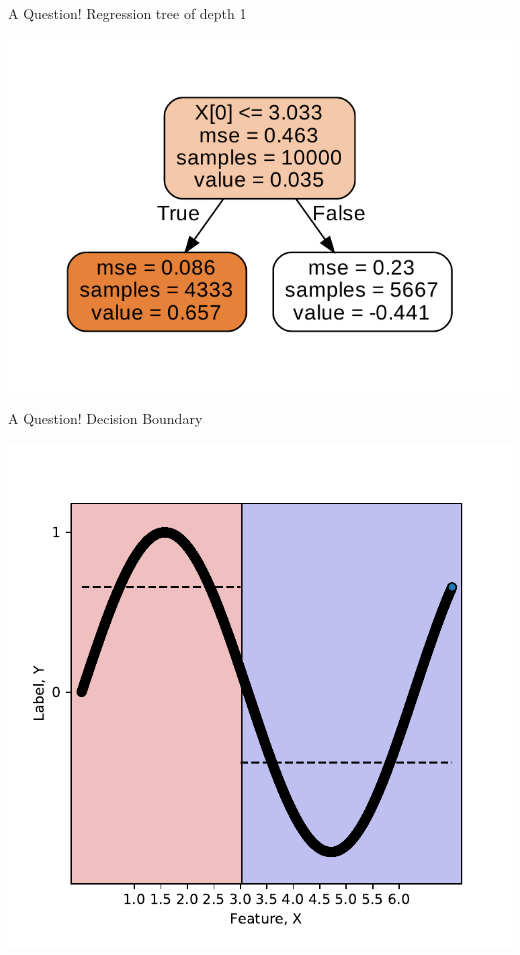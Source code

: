 \documentclass{beamer}
\begin{document}
\begin{frame}{A Question!}
Regression tree of depth 1
\begin{center}
\includegraphics[scale=0.5]{decision-trees-regression/imgs/sine-depth-1-decision-tree}
\end{center}
\end{frame}

\begin{frame}{A Question!}
Decision Boundary
\begin{center}
\includegraphics[scale=0.5]{decision-trees-regression/imgs/sine-depth-1-tree}
\end{center}
\end{frame}
\end{document}

